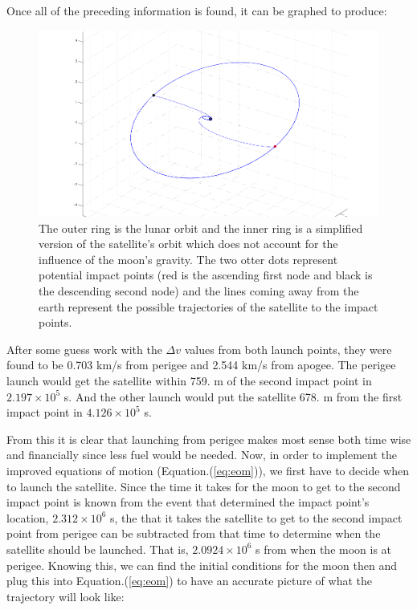 \documentclass{article}
\begin{document}
Once all of the preceding information is found, it can be graphed to produce:
\begin{figure}[H]\centering
    \includegraphics[width=\textwidth]{orbits.png}
  \caption{The outer ring is the lunar orbit and the inner ring is a
simplified version of the satellite's orbit which does not account for
the influence of the moon's gravity. The two otter dots represent
potential impact points (red is the ascending first node and black is
the descending second node) and the lines coming away from the earth
represent the possible trajectories of the satellite to the impact points.}
  \label{fig:orbitssimp}
\end{figure}

After some guess work with the $\Delta v$ values from both launch
points, they were found to be 0.703 km/s from perigee and 2.544 km/s
from apogee. The perigee launch would get the satellite within 759. m
of the second impact point in $2.197 \times 10^5$ s. And the other
launch would put the satellite 678. m from the first impact point in
$4.126 \times 10^5$ s.

From this it is clear that launching from perigee makes most sense
both time wise and financially since less fuel would be needed.
Now, in order to implement the improved equations of motion
(Equation.(\ref{eq:eom})),
we first have to decide when to launch the satellite. Since the time
it takes for the moon to get to the second impact point is known from
the event that determined the impact point's location, $2.312\times
10^6$ s, the that it takes the satellite to get to the second impact
point from perigee can be subtracted from that time to determine when
the satellite should be launched. That is, $2.0924\times 10^6$ s from
when the moon is at perigee. Knowing this, we can find the
initial conditions for the moon then and plug this into
Equation.(\ref{eq:eom}) to have an accurate picture of what the
trajectory will look like:
\end{document}

